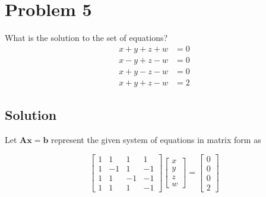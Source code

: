 \section*{Problem 5}

What is the solution to the set of equations?
\begin{align*}
    x + y + z + w & = 0 \\
    x - y + z - w & = 0 \\
    x + y - z - w & = 0 \\
    x + y + z - w & = 2
\end{align*}

\subsection*{Solution}

Let \( \mathbf{A}\mathbf{x} = \mathbf{b} \) represent the given system of equations in matrix form as

\begin{equation*}
    \begin{bmatrix}
        1 & 1  & 1  & 1  \\
        1 & -1 & 1  & -1 \\
        1 & 1  & -1 & -1 \\
        1 & 1  & 1  & -1
    \end{bmatrix}
    \begin{bmatrix}
        x \\
        y \\
        z \\
        w
    \end{bmatrix}
    =
    \begin{bmatrix}
        0 \\
        0 \\
        0 \\
        2
    \end{bmatrix}
\end{equation*}
